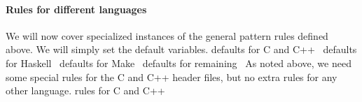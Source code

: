 \paragraph{Rules for different languages}

We will now cover specialized instances of the general pattern rules defined 
above.
We will simply set the default variables.
\nwenddocs{}\plusendmoddef\nwstartdeflinemarkup{}\nwenddeflinemarkup
\LA{}defaults for C and C++~{\nwtagstyle{}}\RA{}
\LA{}defaults for Haskell~{\nwtagstyle{}}\RA{}
\LA{}defaults for Make~{\nwtagstyle{}}\RA{}
\LA{}defaults for remaining~{\nwtagstyle{}}\RA{}
\nwendcode{}As noted above, we need some special rules for the C and C++ header files, 
but no extra rules for any other language.
\nwenddocs{}\endmoddef\nwstartdeflinemarkup{}\nwenddeflinemarkup
\LA{}rules for C and C++~{\nwtagstyle{}}\RA{}
\nwendcode{}\nwdocspar


